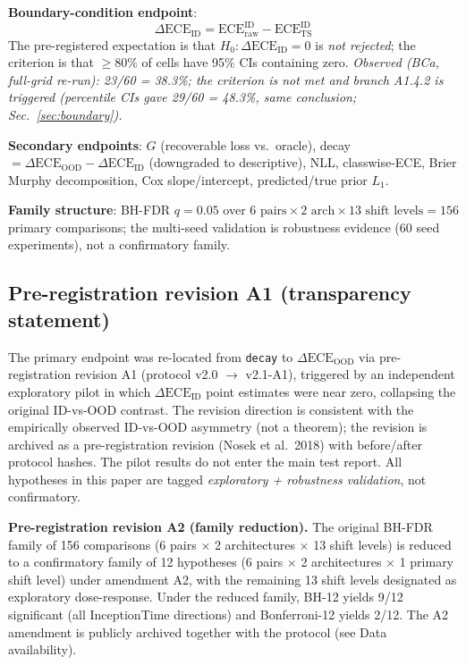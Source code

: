 \documentclass[review,12pt,nonatbib]{elsarticle}
\begin{document}
\textbf{Boundary-condition endpoint}:
\begin{equation}
    \Delta\text{ECE}_{\text{ID}}
    = \text{ECE}_{\mathrm{raw}}^{\mathrm{ID}} - \text{ECE}_{\mathrm{TS}}^{\mathrm{ID}}
\end{equation}
The pre-registered expectation is that $H_0: \Delta\text{ECE}_{\text{ID}} = 0$ is \emph{not rejected};
the criterion is that $\geq 80\%$ of cells have 95\% CIs containing zero.
\emph{Observed (BCa, full-grid re-run): 23/60 = 38.3\%; the criterion is
not met and branch A1.4.2 is triggered (percentile CIs gave 29/60 =
48.3\%, same conclusion; Sec.~\ref{sec:boundary}).}

\textbf{Secondary endpoints}: $G$ (recoverable loss vs.\ oracle),
decay $=\Delta\text{ECE}_{\text{OOD}}-\Delta\text{ECE}_{\text{ID}}$
(downgraded to descriptive), NLL, classwise-ECE, Brier Murphy
decomposition, Cox slope/intercept, predicted/true prior $L_1$.

\textbf{Family structure}: BH-FDR $q=0.05$ over $6\text{ pairs}\times 2\text{ arch}\times 13\text{ shift levels}=156$
primary comparisons; the multi-seed validation is robustness evidence
(60 seed experiments), not a confirmatory family.

\subsection{Pre-registration revision A1 (transparency statement)}
The primary endpoint was re-located from \texttt{decay} to
$\Delta\text{ECE}_{\text{OOD}}$ via pre-registration revision A1
(protocol v2.0 $\rightarrow$ v2.1-A1), triggered by an independent
exploratory pilot in which $\Delta\text{ECE}_{\text{ID}}$ point
estimates were near zero, collapsing the original ID-vs-OOD contrast.
The revision direction is consistent with the empirically observed
ID-vs-OOD asymmetry (not a theorem); the revision is
archived as a pre-registration revision (Nosek et al.\ 2018) with
before/after protocol hashes. The pilot results do not enter the
main test report. All hypotheses in this paper are tagged
\emph{exploratory + robustness validation}, not confirmatory.

\textbf{Pre-registration revision A2 (family reduction).} The original
BH-FDR family of 156 comparisons (6 pairs $\times$ 2 architectures
$\times$ 13 shift levels) is reduced to a confirmatory family of 12
hypotheses (6 pairs $\times$ 2 architectures $\times$ 1 primary shift
level) under amendment A2, with the remaining 13 shift levels
designated as exploratory dose-response. Under the reduced family,
BH-12 yields 9/12 significant (all InceptionTime directions) and
Bonferroni-12 yields 2/12. The A2 amendment is publicly archived
together with the protocol (see Data availability).
\end{document}

